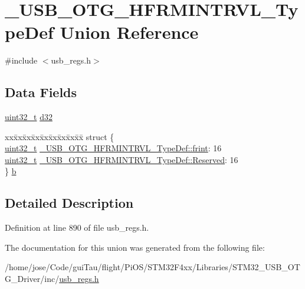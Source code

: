 \hypertarget{union___u_s_b___o_t_g___h_f_r_m_i_n_t_r_v_l___type_def}{\section{\-\_\-\-U\-S\-B\-\_\-\-O\-T\-G\-\_\-\-H\-F\-R\-M\-I\-N\-T\-R\-V\-L\-\_\-\-Type\-Def Union Reference}
\label{union___u_s_b___o_t_g___h_f_r_m_i_n_t_r_v_l___type_def}
}


{\ttfamily \#include $<$usb\-\_\-regs.\-h$>$}

\subsection*{Data Fields}
\begin{DoxyCompactItemize}
\item 
\hyperlink{stdint_8h_a435d1572bf3f880d55459d9805097f62}{uint32\-\_\-t} \hyperlink{group___u_s_b___o_t_g___d_r_i_v_e_r_ga9f687d93bf8619d44c7bba5478bf9362}{d32}
\item 
\begin{tabbing}
xx\=xx\=xx\=xx\=xx\=xx\=xx\=xx\=xx\=\kill
struct \{\\
\>\hyperlink{stdint_8h_a435d1572bf3f880d55459d9805097f62}{uint32\_t} \hyperlink{group___u_s_b___o_t_g___d_r_i_v_e_r_ga6710e8bdf4a117215581628f7cf8ad57}{\_USB\_OTG\_HFRMINTRVL\_TypeDef::frint}: 16\\
\>\hyperlink{stdint_8h_a435d1572bf3f880d55459d9805097f62}{uint32\_t} \hyperlink{group___u_s_b___o_t_g___d_r_i_v_e_r_ga113e497b721389ae73ab4479a2bc5601}{\_USB\_OTG\_HFRMINTRVL\_TypeDef::Reserved}: 16\\
\} \hyperlink{group___u_s_b___o_t_g___d_r_i_v_e_r_ga718ffaa7de28efab5036c4b914725c50}{b}\\

\end{tabbing}\end{DoxyCompactItemize}


\subsection{Detailed Description}


Definition at line 890 of file usb\-\_\-regs.\-h.



The documentation for this union was generated from the following file\-:\begin{DoxyCompactItemize}
\item 
/home/jose/\-Code/gui\-Tau/flight/\-Pi\-O\-S/\-S\-T\-M32\-F4xx/\-Libraries/\-S\-T\-M32\-\_\-\-U\-S\-B\-\_\-\-O\-T\-G\-\_\-\-Driver/inc/\hyperlink{_s_t_m32_f4xx_2_libraries_2_s_t_m32___u_s_b___o_t_g___driver_2inc_2usb__regs_8h}{usb\-\_\-regs.\-h}\end{DoxyCompactItemize}

